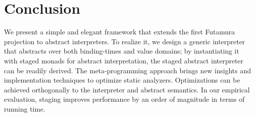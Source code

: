 \section{Conclusion}

We present a simple and elegant framework that extends the first Futamura
projection to abstract interpreters.
To realize it, we design a generic interpreter that abstracts over both
binding-times and value domains; by instantiating it with staged monads for
abstract interpretation, the staged abstract interpreter can be readily derived.
The meta-programming approach brings new insights and implementation techniques
to optimize static analyzers. Optimizations can be achieved orthogonally to 
the interpreter and abstract semantics.  In our empirical evaluation, staging
improves performance by an order of magnitude in terms of running time.
